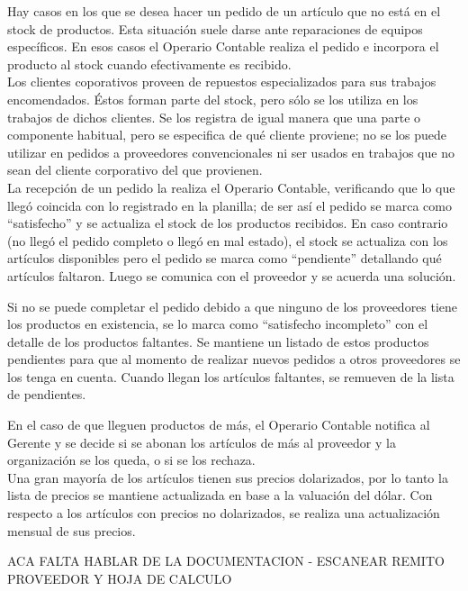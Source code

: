 \documentclass[12pt]{extarticle}
\begin{document}
\begin{spacing}{1.2}
    Hay casos en los que se desea hacer un pedido de un artículo que no está en el stock de productos. Esta situación suele darse ante reparaciones de equipos específicos. En esos casos el Operario Contable realiza el pedido e incorpora el producto al stock cuando efectivamente es recibido.\\

    Los clientes coporativos proveen de repuestos especializados para sus trabajos encomendados. Éstos forman parte del stock, pero sólo se los utiliza en los trabajos de dichos clientes. Se los registra de igual manera que una parte o componente habitual, pero se especifica de qué cliente proviene; no se los puede utilizar en pedidos a proveedores convencionales ni ser usados en trabajos que no sean del cliente corporativo del que provienen.\\

    La recepción de un pedido la realiza el Operario Contable, verificando que lo que llegó coincida con lo registrado en la planilla; de ser así el pedido se marca como ``satisfecho'' y se actualiza el stock de los productos recibidos. En caso contrario (no llegó el pedido completo o llegó en mal estado), el stock se actualiza con los artículos disponibles pero el pedido se marca como ``pendiente'' detallando qué artículos faltaron. Luego se comunica con el proveedor y se acuerda una solución.

    Si no se puede completar el pedido debido a que ninguno de los proveedores tiene los productos en existencia, se lo marca como ``satisfecho incompleto'' con el detalle de los productos faltantes. Se mantiene un listado de estos productos pendientes para que al momento de realizar nuevos pedidos a otros proveedores se los tenga en cuenta. Cuando llegan los artículos faltantes, se remueven de la lista de pendientes.

    En el caso de que lleguen productos de más, el Operario Contable notifica al Gerente y se decide si se abonan los artículos de más al proveedor y la organización se los queda, o si se los rechaza.\\

    Una gran mayoría de los artículos tienen sus precios dolarizados, por lo tanto la lista de precios se mantiene actualizada en base a la valuación del dólar. Con respecto a los artículos con precios no dolarizados, se realiza una actualización mensual de sus precios.
    
    ACA FALTA HABLAR DE LA DOCUMENTACION - ESCANEAR REMITO PROVEEDOR Y HOJA DE CALCULO 
    

\end{spacing}
\end{document}
